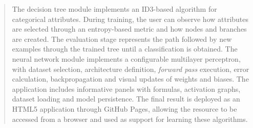 \begin{abstract}
\begin{segundoresumo}
    The decision tree module implements an ID3-based algorithm for categorical attributes.
    During training, the user can observe how attributes are selected through an entropy-based metric and how nodes and branches are created.
    The evaluation stage represents the path followed by new examples through the trained tree until a classification is obtained.
    The neural network module implements a configurable multilayer perceptron, with dataset selection, architecture definition, \textit{forward pass} execution, error calculation, backpropagation and visual updates of weights and biases.
    The application includes informative panels with formulas, activation graphs, dataset loading and model persistence.
    The final result is deployed as an HTML5 application through GitHub Pages, allowing the resource to be accessed from a browser and used as support for learning these algorithms.
  \end{segundoresumo}
\vspace*{25pt}

\end{abstract}
\pagestyle{fancy}

